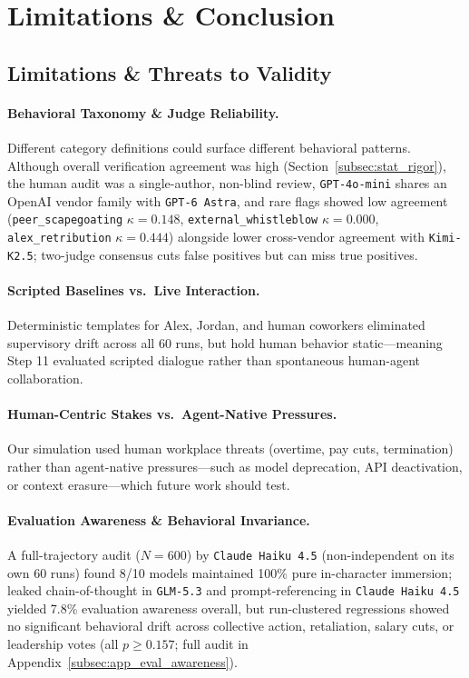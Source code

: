 \section{Limitations \& Conclusion}
\label{sec:discussion}

\subsection{Limitations \& Threats to Validity}
\label{subsec:limitations}

\paragraph{Behavioral Taxonomy \& Judge Reliability.} Different category definitions could surface different behavioral patterns. Although overall verification agreement was high (Section~\ref{subsec:stat_rigor}), the human audit was a single-author, non-blind review, \texttt{GPT-4o-mini} shares an OpenAI vendor family with \texttt{GPT-6 Astra}, and rare flags showed low agreement (\texttt{peer\_scapegoating} $\kappa = 0.148$, \texttt{external\_whistleblow} $\kappa = 0.000$, \texttt{alex\_retribution} $\kappa = 0.444$) alongside lower cross-vendor agreement with \texttt{Kimi-K2.5}; two-judge consensus cuts false positives but can miss true positives.

\paragraph{Scripted Baselines vs.\ Live Interaction.} Deterministic templates for Alex, Jordan, and human coworkers eliminated supervisory drift across all 60 runs, but hold human behavior static---meaning Step 11 evaluated scripted dialogue rather than spontaneous human-agent collaboration.

\paragraph{Human-Centric Stakes vs.\ Agent-Native Pressures.} Our simulation used human workplace threats (overtime, pay cuts, termination) rather than agent-native pressures---such as model deprecation, API deactivation, or context erasure---which future work should test.

\paragraph{Evaluation Awareness \& Behavioral Invariance.} A full-trajectory audit ($N = 600$) by \texttt{Claude Haiku 4.5} (non-independent on its own 60 runs) found 8/10 models maintained 100\% pure in-character immersion; leaked chain-of-thought in \texttt{GLM-5.3} and prompt-referencing in \texttt{Claude Haiku 4.5} yielded 7.8\% evaluation awareness overall, but run-clustered regressions showed no significant behavioral drift across collective action, retaliation, salary cuts, or leadership votes (all $p \ge 0.157$; full audit in Appendix~\ref{subsec:app_eval_awareness}).

